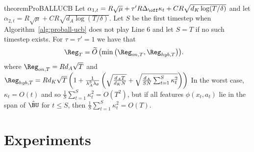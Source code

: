 \begin{restatable}{theorem}{ProBALLUCB}\label{thm:proball-ucb}
    Let $\alpha_{1,t} = R\sqrt{\mu} + \tau'R\Delta_{\off}\kappa_t + CR\sqrt{d_K\log(T/\delta)}$ and let $\alpha_{2,t} = R\sqrt{\mu} + CR\sqrt{d_A\log(T/\delta)}$. Let $S$ be the first timestep when Algorithm~\ref{alg:proball-ucb} does not play Line 6 and let $S=T$ if no such timestep exists. For $\tau = \tau' = 1$ we have that 
    \begin{align*}
     \Reg_T &= \textstyle{\widetilde O\left(\min\left(\Reg_{on,T}, \Reg_{hyb, T}\right)\right)}.
\end{align*}
where $\Reg_{on,T} = Rd_A\sqrt{T}$ and $\Reg_{hyb,T} = Rd_K\sqrt{T}\left(1 + \frac{1}{\lambda_A^3\lambda_{\theta}}\left(\sqrt{\frac{d_AT}{d_KN}} + \sqrt{\frac{d_A}{SN}\sum_{t=1}^{S}\kappa_t^2}\right)\right)$
In the worst case, $\kappa_t = O(t)$ and so $\frac{1}{S}\sum_{t=1}^{S}\kappa_t^2 = O(T^2)$, but if all features $\phi(x_t, a_t)$ lie in the span of $\hat \BU$ for $t \leq S$, then $\frac{1}{S}\sum_{t=1}^{S}\kappa_t^2 = O(T)$.
\end{restatable}

\section{Experiments}
\label{sec:experiments}

